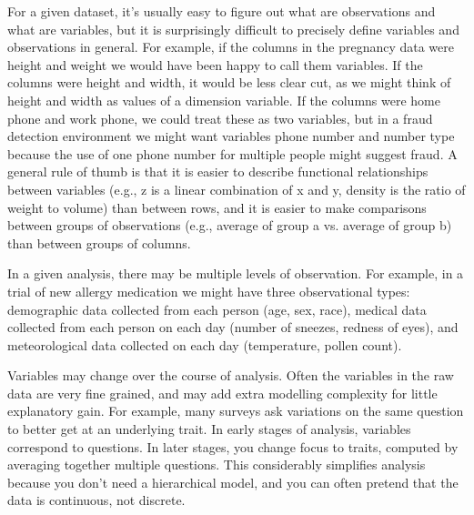 For a given dataset, it's usually easy to figure out what are observations and what are variables, but it is surprisingly difficult to precisely define variables and observations in general. For example, if the columns in the pregnancy data were height and weight we would have been happy to call them variables. If the columns were height and width, it would be less clear cut, as we might think of height and width as values of a dimension variable. If the columns were home phone and work phone, we could treat these as two variables, but in a fraud detection environment we might want variables phone number and number type because the use of one phone number for multiple people might suggest fraud. A general rule of thumb is that it is easier to describe functional relationships between variables (e.g., z is a linear combination of x and y, density is the ratio of weight to volume) than between rows, and it is easier to make comparisons between groups of observations (e.g., average of group a vs. average of group b) than between groups of columns.

In a given analysis, there may be multiple levels of observation. For example, in a trial of new allergy medication we might have three observational types: demographic data collected from each person (age, sex, race), medical data collected from each person on each day (number of sneezes, redness of eyes), and meteorological data collected on each day (temperature, pollen count).

Variables may change over the course of analysis. Often the variables in the raw data are very fine grained, and may add extra modelling complexity for little explanatory gain. For example, many surveys ask variations on the same question to better get at an underlying trait. In early stages of analysis, variables correspond to questions. In later stages, you change focus to traits, computed by averaging together multiple questions. This considerably simplifies analysis because you don't need a hierarchical model, and you can often pretend that the data is continuous, not discrete.



